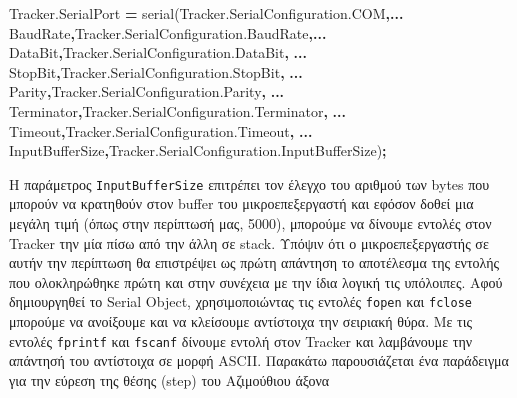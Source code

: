 \documentclass[
  a4paper,
  twoside,
  titlepage,
  12pt]{article}
\newenvironment{Shaded}{\begin{snugshade}}{\end{snugshade}}
\newcommand{\NormalTok}[1]{#1}
\newcommand{\OperatorTok}[1]{\textcolor[rgb]{0.81,0.36,0.00}{\textbf{#1}}}
\newcommand{\SpecialStringTok}[1]{\textcolor[rgb]{0.31,0.60,0.02}{#1}}
\newcommand{\VariableTok}[1]{\textcolor[rgb]{0.00,0.00,0.00}{#1}}
\numberwithin{equation}{section}
\numberwithin{figure}{section}
\numberwithin{table}{section}
\begin{document}
\begin{Shaded}
\begin{Highlighting}[]
\VariableTok{Tracker}\NormalTok{.}\VariableTok{SerialPort} \OperatorTok{=} \VariableTok{serial}\NormalTok{(}\VariableTok{Tracker}\NormalTok{.}\VariableTok{SerialConfiguration}\NormalTok{.}\VariableTok{COM}\OperatorTok{,...}
    \SpecialStringTok{\textquotesingle{}BaudRate\textquotesingle{}}\OperatorTok{,}\VariableTok{Tracker}\NormalTok{.}\VariableTok{SerialConfiguration}\NormalTok{.}\VariableTok{BaudRate}\OperatorTok{,...}
    \SpecialStringTok{\textquotesingle{}DataBit\textquotesingle{}}\OperatorTok{,}\VariableTok{Tracker}\NormalTok{.}\VariableTok{SerialConfiguration}\NormalTok{.}\VariableTok{DataBit}\OperatorTok{,} \OperatorTok{...}
    \SpecialStringTok{\textquotesingle{}StopBit\textquotesingle{}}\OperatorTok{,}\VariableTok{Tracker}\NormalTok{.}\VariableTok{SerialConfiguration}\NormalTok{.}\VariableTok{StopBit}\OperatorTok{,} \OperatorTok{...}
    \SpecialStringTok{\textquotesingle{}Parity\textquotesingle{}}\OperatorTok{,}\VariableTok{Tracker}\NormalTok{.}\VariableTok{SerialConfiguration}\NormalTok{.}\VariableTok{Parity}\OperatorTok{,} \OperatorTok{...}
    \SpecialStringTok{\textquotesingle{}Terminator\textquotesingle{}}\OperatorTok{,}\VariableTok{Tracker}\NormalTok{.}\VariableTok{SerialConfiguration}\NormalTok{.}\VariableTok{Terminator}\OperatorTok{,} \OperatorTok{...}
    \SpecialStringTok{\textquotesingle{}Timeout\textquotesingle{}}\OperatorTok{,}\VariableTok{Tracker}\NormalTok{.}\VariableTok{SerialConfiguration}\NormalTok{.}\VariableTok{Timeout}\OperatorTok{,} \OperatorTok{...}
    \SpecialStringTok{\textquotesingle{}InputBufferSize\textquotesingle{}}\OperatorTok{,}\VariableTok{Tracker}\NormalTok{.}\VariableTok{SerialConfiguration}\NormalTok{.}\VariableTok{InputBufferSize}\NormalTok{)}\OperatorTok{;}
\end{Highlighting}
\end{Shaded}

Η παράμετρος \texttt{InputBufferSize} επιτρέπει τον έλεγχο του αριθμού των bytes που μπορούν να κρατηθούν στον buffer του μικροεπεξεργαστή και εφόσον δοθεί μια μεγάλη τιμή (όπως στην περίπτωσή μας, 5000), μπορούμε να δίνουμε εντολές στον Tracker την μία πίσω από την άλλη σε stack. Υπόψιν ότι ο μικροεπεξεργαστής σε αυτήν την περίπτωση θα επιστρέψει ως πρώτη απάντηση το αποτέλεσμα της εντολής που ολοκληρώθηκε πρώτη και στην συνέχεια με την ίδια λογική τις υπόλοιπες. Αφού δημιουργηθεί το Serial Object, χρησιμοποιώντας τις εντολές \texttt{fopen} και \texttt{fclose} μπορούμε να ανοίξουμε και να κλείσουμε αντίστοιχα την σειριακή θύρα. Με τις εντολές \texttt{fprintf} και \texttt{fscanf} δίνουμε εντολή στον Tracker και λαμβάνουμε την απάντησή του αντίστοιχα σε μορφή ASCII. Παρακάτω παρουσιάζεται ένα παράδειγμα για την εύρεση της θέσης (step) του Αζιμούθιου άξονα
\end{document}

